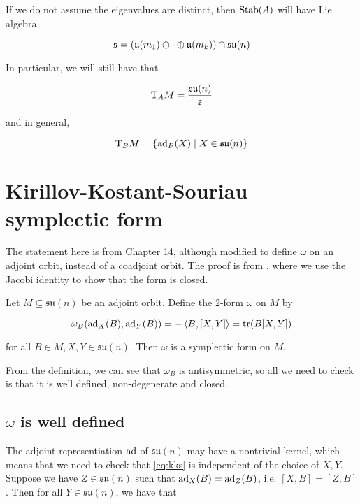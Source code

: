 \documentclass{article}
\newcommand{\su}{\mathfrak{su}}
\begin{document}
If we do not assume the eigenvalues are distinct, then \(\operatorname{Stab}(A)\) will have Lie algebra

\[\mfs = \left(\mfu(m_1) \oplus \cdot \oplus \mfu(m_k)\right) \cap \su(n)\]

In particular, we will still have that

\[\TT_A M = \frac{\su(n)}{\mfs}\]

and in general,

\[\TT_B M = \left\{\ad_B(X) \mid X \in \su(n)\right\}\]

\section{Kirillov-Kostant-Souriau symplectic form}

\label{sec:kks}

The statement here is from \cite{marsden_ratiu} Chapter 14, although modified to define \(\omega\) on an adjoint orbit, instead of a coadjoint orbit. The proof is from \cite[Section II.1.d]{audin}, where we use the Jacobi identity to show that the form is closed.

\begin{theorem}
    
    Let \(M \subseteq \su(n)\) be an adjoint orbit. Define the \(2\)-form \(\omega\) on \( M\) by

    \begin{equation}
        \label{eq:kks}
        \omega_B(\operatorname{ad}_X(B), \operatorname{ad}_Y(B)) = -\left\langle B, [X, Y] \right\rangle = \tr(B[X,Y])
    \end{equation}

    for all \(B \in M, X, Y \in \su(n)\). Then \(\omega\) is a symplectic form on \(M\).

    \label{thm:kks}
\end{theorem}

From the definition, we can see that \(\omega_B\) is antisymmetric, so all we need to check is that it is well defined, non-degenerate and closed.

\subsection{\(\omega\) is well defined}

The adjoint representiation \(\operatorname{ad}\) of \(\su(n)\) may have a nontrivial kernel, which means that we need to check that \cref{eq:kks} is independent of the choice of \(X, Y\). Suppose we have \(Z \in \su(n)\) such that \(\operatorname{ad}_X(B) = \operatorname{ad}_Z(B)\), i.e. \([X, B] = [Z, B]\). Then for all \(Y \in \su(n)\), we have that
\end{document}
